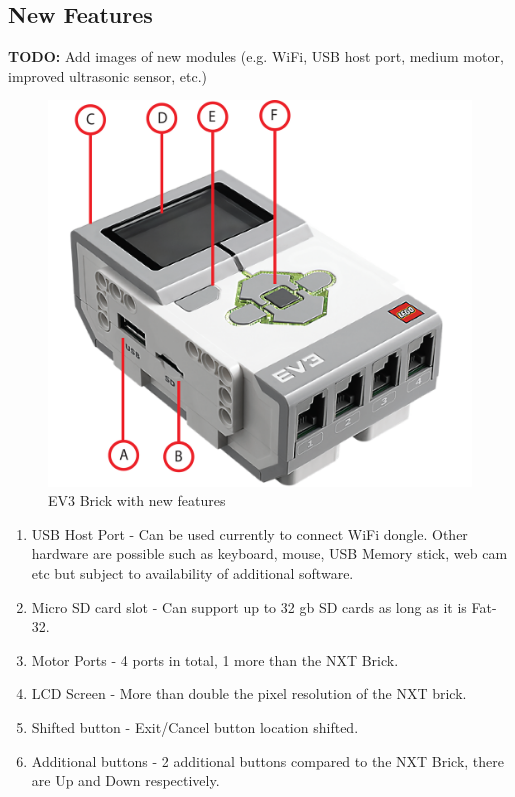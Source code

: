 \documentclass[11pt, a4paper, oneside]{article}
\begin{document}
		\subsection{New Features}
		\textbf{TODO:} Add images of new modules (e.g. WiFi, USB host port, medium motor, improved ultrasonic sensor, etc.)
		
		\begin{figure}[h!]
	  	\centering
	  	\includegraphics[scale=0.45]{img/EV3Brick_Labelled.png}
		\caption{EV3 Brick with new features}
		\end{figure}

		\begin{enumerate}[A:]
		\item USB Host Port - Can be used currently to connect WiFi dongle. Other hardware are possible such as keyboard, mouse, USB Memory stick, web cam etc but subject to availability of additional software.
		
		\item Micro SD card slot - Can support up to 32 gb SD cards as long as it is Fat-32.
		
		\item Motor Ports - 4 ports in total, 1 more than the NXT Brick.
		
		\item LCD Screen - More than double the pixel resolution of the NXT brick.
		
		\item Shifted button - Exit/Cancel button location shifted.
		
		\item Additional buttons - 2 additional buttons compared to the NXT Brick, there are Up and Down respectively.
		
		\end{enumerate}
		
\end{document}
